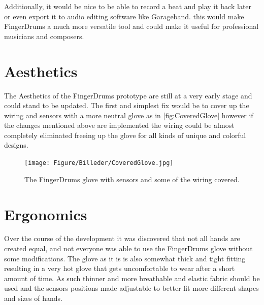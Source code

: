 Additionally, it would be nice to be able to record a beat and play it back later or even export it to audio editing software like Garageband. this would make FingerDrums a much more versatile tool and could make it useful for professional musicians and composers. 



\section{Aesthetics }
The Aesthetics of the FingerDrums prototype are still at a very early stage and could stand to be updated. The first and simplest fix would be to cover up the wiring and sensors with a more neutral glove as in \autoref{fig:CoveredGlove} however if the changes mentioned above are implemented the wiring could be almost completely eliminated freeing up the glove for all kinds of unique and colorful designs.

\begin{figure}[H]
\centering
\texttt{[image: Figure/Billeder/CoveredGlove.jpg]}
\caption{The FingerDrums glove with sensors and some of the wiring covered.}
\label{fig:CoveredGlove}
\end{figure}

\section{Ergonomics}
Over the course of the development it was discovered that not all hands are created equal, and not everyone was able to use the FingerDrums glove without some modifications. The glove as it is is also somewhat thick and tight fitting resulting in a very hot glove that gets uncomfortable to wear after a short amount of time. As such thinner and more breathable and elastic fabric should be used and the sensors  positions made adjustable to better fit more different shapes and sizes of hands. 